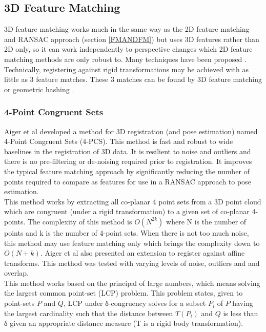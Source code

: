 \subsection{3D Feature Matching}

3D feature matching works much in the same way as the 2D feature matching and RANSAC approach (section \ref{FMANDFM}) but uses 3D features rather than 2D only, so it can work independently to perspective changes which 2D feature matching methods are only robust to. Many techniques have been proposed \cite{Scovanner073Dimensional,Flitton10Object,Li05Multiscale}. Technically, registering against rigid transformations may be achieved with as little as 3 feature matches. These 3 matches can be found by 3D feature matching or geometric hashing \cite{Wolfson97Geometric}.



\subsubsection{4-Point Congruent Sets}

Aiger et al \cite{Aiger084} developed a method for 3D registration (and pose estimation) named 4-Point Congruent Sets (4-PCS). This method is fast and robust to wide baselines in the registration of 3D data. It is resilient to noise and outliers and there is no pre-filtering or de-noising required prior to registration. It improves the typical feature matching approach by significantly reducing the number of points required to compare as features for use in a RANSAC approach to pose estimation. \\

This method works by extracting all co-planar 4 point sets from a 3D point cloud which are congruent (under a rigid transformation) to a given set of co-planar 4-points. The complexity of this method is $O(N^{2k})$ where N is the number of points and k is the number of 4-point sets. When there is not too much noise, this method may use feature matching only which brings the complexity down to $O(N+k)$. Aiger et al also presented an extension to register against affine transforms. This method was tested with varying levels of noise, outliers and and overlap. \\

This method works based on the principal of large numbers, which means solving the largest common point-set (LCP) problem. This problem states, given to point-sets $P$ and $Q$, LCP under δ-congruency solves for a subset $P_i$ of $P$ having the largest cardinality such that the distance between $T(P_i)$ and $Q$  is less than δ given an appropriate distance measure (T is a rigid body transformation). \\

